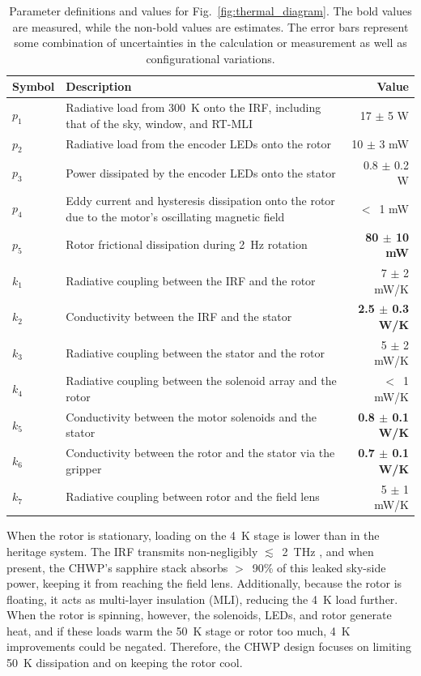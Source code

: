 \begin{table}
\caption{\label{tab:thermal_values} Parameter definitions and values for Fig.~\ref{fig:thermal_diagram}. The bold values are measured, while the non-bold values are estimates. The error bars represent some combination of uncertainties in the calculation or measurement as well as configurational variations.}
\centering
\begin{tabu}{| l | p{10cm} | r |}
    \hline
    Symbol & Description & Value \\
    \hline
    \hline
    $p_{1}$ & Radiative load from 300~K onto the IRF, including that of the sky, window, and RT-MLI & 17 $\pm$ 5 W \\
    \hline
    $p_{2}$ & Radiative load from the encoder LEDs onto the rotor & 10 $\pm$ 3 mW \\
    \hline
    $p_{3}$ & Power dissipated by the encoder LEDs onto the stator & 0.8 $\pm$ 0.2 W\\
    \hline
    $p_{4}$ & Eddy current and hysteresis dissipation onto the rotor due to the motor's oscillating magnetic field  & $<$~1 mW \\
    \hline
    $p_{5}$ & Rotor frictional dissipation during 2~Hz rotation & \textbf{80 $\pm$ 10 mW} \\
    \hline
    $k_{1}$ & Radiative coupling between the IRF and the rotor & 7 $\pm$ 2 mW/K \\
    \hline
    $k_{2}$ & Conductivity between the IRF and the stator & \textbf{2.5 $\pm$ 0.3 W/K} \\
    \hline
    $k_{3}$ & Radiative coupling between the stator and the rotor & 5 $\pm$ 2 mW/K \\
    \hline
    $k_{4}$ & Radiative coupling between the solenoid array and the rotor & $<$~1 mW/K \\
    \hline
    $k_{5}$ & Conductivity between the motor solenoids and the stator & \textbf{0.8 $\pm$ 0.1 W/K} \\
    \hline
    $k_{6}$ & Conductivity between the rotor and the stator via the gripper & \textbf{0.7 $\pm$  0.1 W/K} \\
    \hline
    $k_{7}$ & Radiative coupling between rotor and the field lens & 5 $\pm$ 1 mW/K \\
    \hline
\end{tabu}
\end{table}

When the rotor is stationary, loading on the 4~K stage is lower than in the heritage system. The IRF transmits non-negligibly $\lesssim$~2~THz \cite{inoue_cryogenic_2014}, and when present, the CHWP's sapphire stack absorbs $>$~90\% of this leaked sky-side power, keeping it from reaching the field lens. Additionally, because the rotor is floating, it acts as multi-layer insulation (MLI), reducing the 4~K load further. When the rotor is spinning, however, the solenoids, LEDs, and rotor generate heat, and if these loads warm the 50~K stage or rotor too much, 4~K improvements could be negated. Therefore, the CHWP design focuses on limiting 50~K dissipation and on keeping the rotor cool. 

